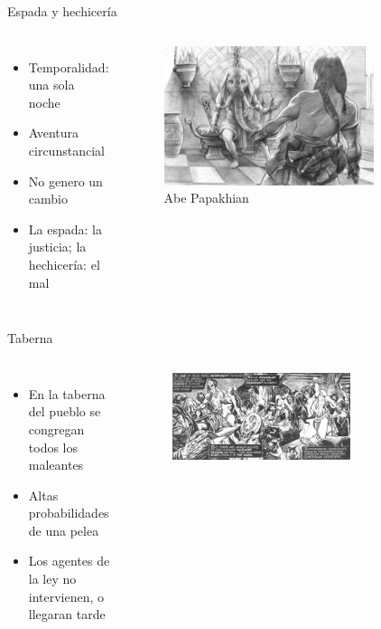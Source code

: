 \begin{frame}{Espada y hechicería}
\begin{columns}
 \begin{itemize}
    \item Temporalidad: una sola noche
    \item Aventura circunstancial
    \item No genero un cambio
    \item La espada: la justicia; la hechicería: el mal
 \end{itemize}
 \begin{figure}[htb]
    \centering
    \includegraphics[width=0.8\textwidth]{img/tributos/elephant07}
    \caption{Abe Papakhian}
 \end{figure}
 \end{columns}
\end{frame}
\note[itemize]{
	\item
}

\begin{frame}{Taberna}
	\begin{columns}
		\begin{itemize}
			\item En la taberna del pueblo se congregan todos los maleantes
			\item Altas probabilidades de una pelea
			\item Los agentes de la ley no intervienen, o llegaran tarde
		\end{itemize}
		\begin{figure}[htb]
			\centering
			\includegraphics[width=0.7\textwidth]{img/tropes/taberna}
		\end{figure}
	\end{columns}
\end{frame}
\note[itemize]{
	\item
}

